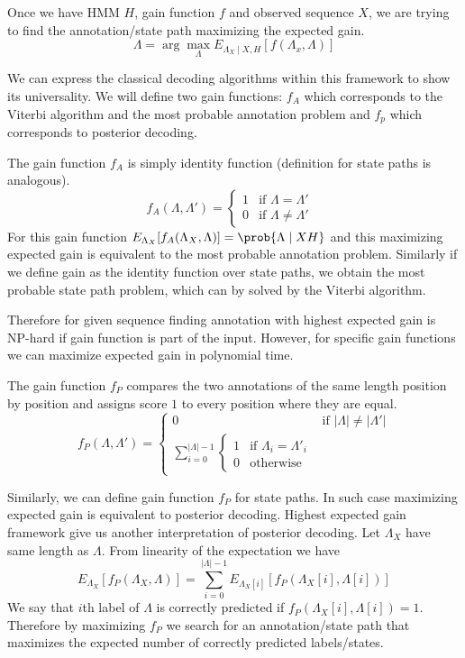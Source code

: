 Once we have HMM $H$, gain function $f$ and observed sequence $X$,
we are trying to find the annotation/state path maximizing the expected gain. 
\begin{equation}
\Lambda = \arg\max_{\Lambda}E_{\Lambda_X\mid
X,H}\left[f\left(\Lambda_x,\Lambda\right)\right]
\end{equation}

We can express the classical decoding algorithms within this framework to show
its universality. We will define two gain functions: $f_A$ which corresponds to
the  
Viterbi algorithm and the most probable annotation problem and $f_p$ which
corresponds to 
posterior decoding.

The gain function $f_A$ is simply identity function (definition for state paths
is analogous).
\begin{equation}
f_A(\Lambda,\Lambda') = \begin{cases}
1 & \text{if $\Lambda = \Lambda'$ }\\
0 & \text{if $\Lambda \not=\Lambda'$}
\end{cases}
\end{equation}
For this gain function $E_{\Lambda_X}[f_A(\Lambda_X,\Lambda)]=\prob{\Lambda\mid
X H}$ and this
maximizing expected gain is 
equivalent to the most probable annotation problem. Similarly if we define gain
as the identity function over state paths, we obtain the most probable state
path problem, which can by solved by the Viterbi algorithm.

Therefore for given sequence finding annotation with highest expected gain is
NP-hard if gain function is part of the input. However, for specific gain
functions we can maximize expected gain in polynomial time.

The gain function $f_P$ compares the two annotations of the same length position
by position and assigns score $1$ to every position where they are equal.
\begin{equation}
f_P(\Lambda,\Lambda') = 
\begin{cases}
0 & \text{if $|\Lambda|\not=|\Lambda'|$}\\
\sum_{i=0}^{|\Lambda|-1}\begin{cases}
1 & \text{if $\Lambda_i=\Lambda'_i$}\\
0 & \text{otherwise}
\end{cases}
\end{cases}
\end{equation}

Similarly, we can define gain function $f_P$ for state paths. In such case
maximizing expected gain is equivalent to posterior decoding. Highest expected
gain framework give us another interpretation of posterior decoding. Let
$\Lambda_X$  have same length as $\Lambda$. From linearity of the expectation we
have
\[E_{\Lambda_X}[f_P(\Lambda_X,\Lambda)] =
\sum_{i=0}^{|\Lambda|-1}E_{\Lambda_X[i]}[f_P(\Lambda_X[i],\Lambda[i])]\]
We say that $i$th label of $\Lambda$ is correctly predicted if $f_P(\Lambda_X[i],\Lambda[i])=1$. Therefore  
by maximizing $f_P$ we search for an annotation/state path that maximizes the
expected number of correctly predicted labels/states.

